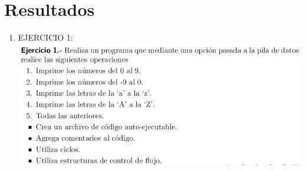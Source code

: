 \documentclass[conference]{IEEEtran}
\begin{document}
\section{Resultados}
\begin{enumerate}
\item  EJERCICIO 1:\\
	\includegraphics{e1} \\
	\begin{center}

\end{center}
\end{enumerate}
\end{document}
